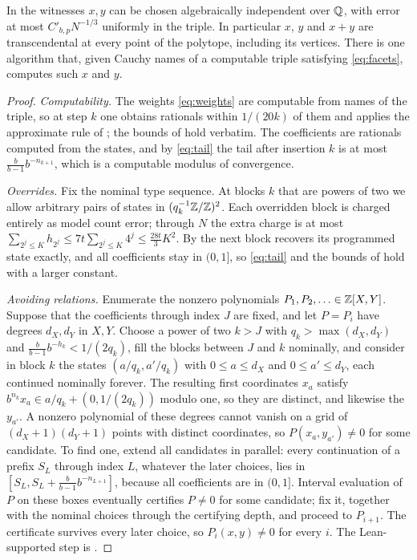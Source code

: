 \documentclass[11pt]{article}
\begin{document}
\begin{theorem}\label{thm:independent}
In  the witnesses $x,y$ can be chosen algebraically independent over $\mathbb Q$, with
error at most $C'_{b,p}N^{-1/3}$ uniformly in the triple. In particular $x$, $y$ and $x+y$ are
transcendental at every point of the polytope, including its vertices. There is one algorithm that,
given Cauchy names of a computable triple satisfying \eqref{eq:facets}, computes such $x$ and $y$.
\end{theorem}

\begin{proof}
\emph{Computability.} The weights \eqref{eq:weights} are computable from names of the triple, so at
step $k$ one obtains rationals within $1/(20k)$ of them and applies the approximate rule of
; the bounds of  hold verbatim. The coefficients are
rationals computed from the states, and by \eqref{eq:tail} the tail after insertion $k$ is at most
$\frac b{b-1}b^{-n_{k+1}}$, which is a computable modulus of convergence.

\emph{Overrides.} Fix the nominal type sequence. At blocks $k$ that are powers of two we allow arbitrary
pairs of states in $(q_k^{-1}\mathbb Z/\mathbb Z)^2$. Each overridden block is charged entirely as model count error;
through $N$ the extra charge is at most $\sum_{2^j\le K}h_{2^j}\le7t\sum_{2^j\le K}4^j\le\frac{28t}3K^2$.
By  the next block recovers its programmed state exactly, and all coefficients stay in
$(0,1]$, so \eqref{eq:tail} and the bounds of  hold with a larger constant.

\emph{Avoiding relations.} Enumerate the nonzero polynomials $P_1,P_2,\ldots\in\mathbb Z[X,Y]$. Suppose that the
coefficients through index $J$ are fixed, and let $P=P_i$ have degrees $d_X,d_Y$ in $X,Y$. Choose a power
of two $k>J$ with $q_k>\max(d_X,d_Y)$ and $\frac b{b-1}b^{-h_k}<1/(2q_k)$, fill the blocks between $J$
and $k$ nominally, and consider in block $k$ the states $(a/q_k,a'/q_k)$ with $0\le a\le d_X$ and
$0\le a'\le d_Y$, each continued nominally forever. The resulting first coordinates $x_a$ satisfy
$b^{n_k}x_a\in a/q_k+(0,1/(2q_k))$ modulo one, so they are distinct, and likewise the $y_{a'}$. A nonzero
polynomial of these degrees cannot vanish on a grid of $(d_X+1)(d_Y+1)$ points with distinct
coordinates, so $P(x_a,y_{a'})\ne0$ for some candidate. To find one, extend all candidates in parallel:
every continuation of a prefix $S_L$ through index $L$, whatever the later choices, lies in
$[S_L,S_L+\frac b{b-1}b^{-n_{L+1}}]$, because all coefficients are in $(0,1]$. Interval evaluation of
$P$ on these boxes eventually certifies $P\ne0$ for some candidate; fix it, together with the nominal
choices through the certifying depth, and proceed to $P_{i+1}$. The certificate survives every later
choice, so $P_i(x,y)\ne0$ for every $i$. The Lean-supported step is .
\end{proof}
\end{document}
